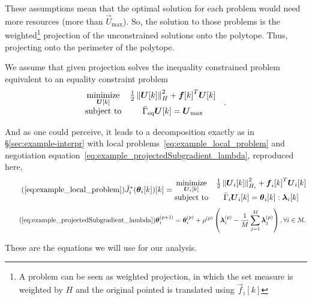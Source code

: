 \documentclass[../main.tex]{subfiles}
\begin{document}
These assumptions mean that the optimal solution for each problem would need more resources (more than $\vec{U}_{\max}$).
So, the solution to those \qp{} problems is the weighted\footnote{A \qp{} problem can be seen as weighted projection, in which the set measure is weighted by $H$ and the original pointed is translated using $\vec{f}_i[k]$} projection of the unconstrained solutions onto the polytope.
Thus, projecting onto the perimeter of the polytope.

We assume that given projection solves the inequality constrained problem equivalent to an equality constraint problem
\begin{equation}
  \label{eq:qp_standard_form_equality}
  \begin{aligned}
    \begin{matrix}
      \mathop{\textrm{minimize}}\limits_{\boldsymbol{U}[k]} &
                                                 \frac{1}{2}\left\lVert\boldsymbol{U}[k]\right\rVert^{2}_{H} + {\boldsymbol{f}[k]}^{T}\boldsymbol{U}[k] &\\
      \mathrm{subject~ to} &
                             \bar{\Gamma}_{\text{eq}}\boldsymbol{U}[k]= {\boldsymbol{U}}_{\text{max}}
    \end{matrix}
  \end{aligned}.
\end{equation}

And as one could perceive, it leads to a decomposition exactly as in \S\ref{sec:example-interpr}
with local problems~\eqref{eq:example_local_problem} and negotiation equation~\eqref{eq:example_projectedSubgradient_lambda}, reproduced here,
\begin{equation}
  \label{eq:example_local_problem_reprise}
  \tag{\ref*{eq:example_local_problem}}
   \eqoptobji(\thetaik)[k]= \begin{matrix}
    \minimize\limits_{\vec{U}_{i}[k]}&\frac{1}{2}\norm{\vec{U}_{i}[k]}^{2}_{H_{i}} + {\vec{f}_{i}[k]}^{T}\vec{U}_{i}[k]\\
    \mathrm{subject~ to} & \bar{\Gamma}_{i}\vec{U}_{i}[k] = \thetaik:\lambdaik
  \end{matrix}
\end{equation}
\begin{equation}
  \label{eq:example_projectedSubgradient_lambda_reprise}
  \tag{\ref*{eq:example_projectedSubgradient_lambda}}
 \thetai\pplusone=\thetai\p+\rho\p\left(\lambdai\p-\frac{1}{M}\sum_{j=1}^{M}\vec{\lambda}_j\p\right),\forall i\in\set{M}.
\end{equation}

These are the equations we will use for our analysis.
\end{document}

